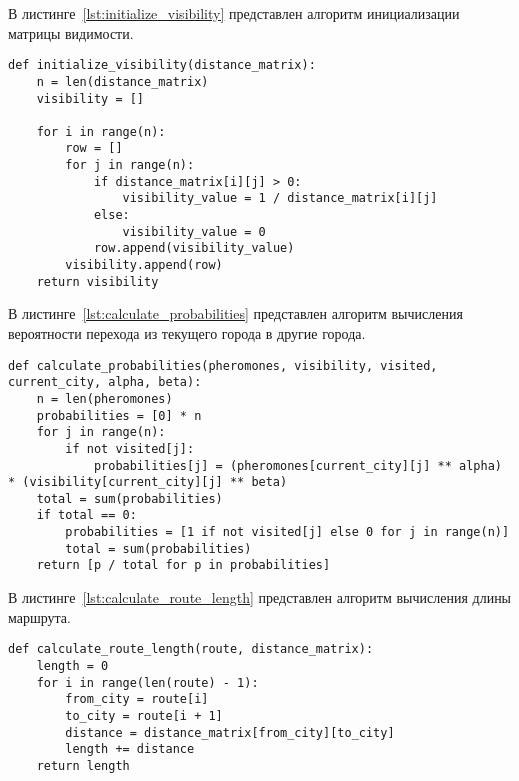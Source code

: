 В листинге~\ref{lst:initialize_visibility} представлен алгоритм инициализации матрицы видимости.
\begin{center}
\begin{lstlisting}[caption={Алгоритм инициализации матрицы видимости}, label={lst:initialize_visibility}]
def initialize_visibility(distance_matrix):
    n = len(distance_matrix)
    visibility = []

    for i in range(n):
        row = []
        for j in range(n):
            if distance_matrix[i][j] > 0:
                visibility_value = 1 / distance_matrix[i][j]
            else:
                visibility_value = 0
            row.append(visibility_value)
        visibility.append(row)
    return visibility
\end{lstlisting}
\end{center}

В листинге~\ref{lst:calculate_probabilities} представлен алгоритм вычисления вероятности перехода из текущего города в другие города.
\begin{center}
\begin{lstlisting}[caption={Алгоритм вычисления вероятности перехода из текущего города в другие города}, label={lst:calculate_probabilities}]
def calculate_probabilities(pheromones, visibility, visited, current_city, alpha, beta):
    n = len(pheromones)
    probabilities = [0] * n
    for j in range(n):
        if not visited[j]:
            probabilities[j] = (pheromones[current_city][j] ** alpha) * (visibility[current_city][j] ** beta)
    total = sum(probabilities)
    if total == 0:
        probabilities = [1 if not visited[j] else 0 for j in range(n)]
        total = sum(probabilities)
    return [p / total for p in probabilities]
\end{lstlisting}
\end{center}

В листинге~\ref{lst:calculate_route_length} представлен алгоритм вычисления длины маршрута.
\begin{center}
\begin{lstlisting}[caption={Алгоритм вычисления вычисления длины маршрута}, label={lst:calculate_route_length}]
def calculate_route_length(route, distance_matrix):
    length = 0
    for i in range(len(route) - 1):
        from_city = route[i]
        to_city = route[i + 1]
        distance = distance_matrix[from_city][to_city]
        length += distance
    return length
\end{lstlisting}
\end{center}

